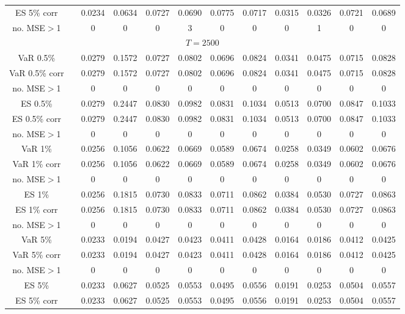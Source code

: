 {{\begin{sidewaystable}
\begin{tabular}{cc cc | cccc | cccc}
ES 5\% corr && 0.0234 & 0.0634 & 0.0727 & 0.0690 & 0.0775 & 0.0717 &0.0315 & 0.0326 & 0.0721 & 0.0689 \\ 
no. MSE$>$1 && 0 & 0 & 0 & 3 & 0 & 0 &0 & 1 & 0 & 0 \\[1ex] 
\hline 
\multicolumn{12}{c}{$T =2500$}  \\ 
\hline 
VaR 0.5\% && 0.0279 & 0.1572 & 0.0727 & 0.0802 & 0.0696 & 0.0824 &0.0341 & 0.0475 & 0.0715 & 0.0828 \\ 
VaR 0.5\% corr && 0.0279 & 0.1572 & 0.0727 & 0.0802 & 0.0696 & 0.0824 &0.0341 & 0.0475 & 0.0715 & 0.0828 \\ 
no. MSE$>$1 && 0 & 0 & 0 & 0 & 0 & 0 &0 & 0 & 0 & 0 \\[1ex] 
ES 0.5\% && 0.0279 & 0.2447 & 0.0830 & 0.0982 & 0.0831 & 0.1034 &0.0513 & 0.0700 & 0.0847 & 0.1033 \\ 
ES 0.5\% corr && 0.0279 & 0.2447 & 0.0830 & 0.0982 & 0.0831 & 0.1034 &0.0513 & 0.0700 & 0.0847 & 0.1033 \\ 
no. MSE$>$1 && 0 & 0 & 0 & 0 & 0 & 0 &0 & 0 & 0 & 0 \\[1.5ex]  
 \rowcolor{LightCyan} 
VaR 1\% && 0.0256 & 0.1056 & 0.0622 & 0.0669 & 0.0589 & 0.0674 &0.0258 & 0.0349 & 0.0602 & 0.0676 \\  
 \rowcolor{LightCyan} 
VaR 1\% corr && 0.0256 & 0.1056 & 0.0622 & 0.0669 & 0.0589 & 0.0674 &0.0258 & 0.0349 & 0.0602 & 0.0676 \\ 
 \rowcolor{LightCyan} 
no. MSE$>$1 && 0 & 0 & 0 & 0 & 0 & 0 &0 & 0 & 0 & 0 \\[1ex] 
 \rowcolor{LightCyan} 
ES 1\% && 0.0256 & 0.1815 & 0.0730 & 0.0833 & 0.0711 & 0.0862 &0.0384 & 0.0530 & 0.0727 & 0.0863 \\ 
 \rowcolor{LightCyan} 
ES 1\% corr && 0.0256 & 0.1815 & 0.0730 & 0.0833 & 0.0711 & 0.0862 &0.0384 & 0.0530 & 0.0727 & 0.0863 \\ 
 \rowcolor{LightCyan} 
no. MSE$>$1 && 0 & 0 & 0 & 0 & 0 & 0 &0 & 0 & 0 & 0 \\[1.5ex] 
VaR 5\% && 0.0233 & 0.0194 & 0.0427 & 0.0423 & 0.0411 & 0.0428 &0.0164 & 0.0186 & 0.0412 & 0.0425 \\ 
VaR 5\% corr && 0.0233 & 0.0194 & 0.0427 & 0.0423 & 0.0411 & 0.0428 &0.0164 & 0.0186 & 0.0412 & 0.0425 \\ 
no. MSE$>$1 && 0 & 0 & 0 & 0 & 0 & 0 &0 & 0 & 0 & 0 \\[1ex] 
ES 5\% && 0.0233 & 0.0627 & 0.0525 & 0.0553 & 0.0495 & 0.0556 &0.0191 & 0.0253 & 0.0504 & 0.0557 \\ 
ES 5\% corr && 0.0233 & 0.0627 & 0.0525 & 0.0553 & 0.0495 & 0.0556 &0.0191 & 0.0253 & 0.0504 & 0.0557 \\ 

\end{tabular}
\end{sidewaystable}}}
